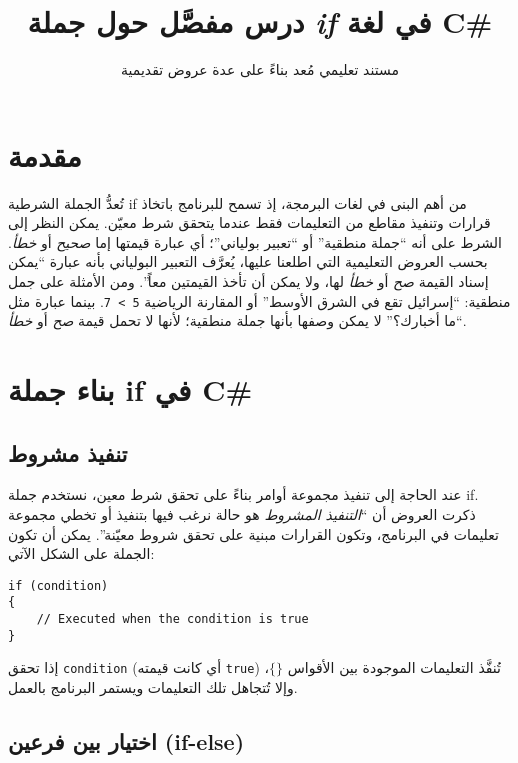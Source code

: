 ﻿\documentclass[12pt]{article}
\begin{document}
\title{درس مفصَّل حول جملة \emph{\textenglish{if}} في لغة C\#}
\author{مستند تعليمي مُعد بناءً على عدة عروض تقديمية}
\date{}

\maketitle
\thispagestyle{fancy}

\section*{مقدمة}

تُعدُّ الجملة الشرطية \textenglish{if} من أهم البنى في لغات البرمجة، إذ تسمح للبرنامج باتخاذ قرارات وتنفيذ مقاطع من التعليمات فقط عندما يتحقق شرط معيّن. يمكن النظر إلى الشرط على أنه ``جملة منطقية'' أو ``تعبير بولياني''؛ أي عبارة قيمتها إما \emph{صحيح} أو \emph{خطأ}. بحسب العروض التعليمية التي اطلعنا عليها، يُعرَّف التعبير البولياني بأنه عبارة ``يمكن إسناد القيمة \emph{صح} أو \emph{خطأ} لها، ولا يمكن أن تأخذ القيمتين معاً''. ومن الأمثلة على جمل منطقية: ``إسرائيل تقع في الشرق الأوسط'' أو المقارنة الرياضية \verb|5 > 7|. بينما عبارة مثل ``ما أخبارك؟'' لا يمكن وصفها بأنها جملة منطقية؛ لأنها لا تحمل قيمة \emph{صح} أو \emph{خطأ}.

\section{بناء جملة \textenglish{if} في C\#}

\subsection{تنفيذ مشروط}

عند الحاجة إلى تنفيذ مجموعة أوامر بناءً على تحقق شرط معين، نستخدم جملة \textenglish{if}. ذكرت العروض أن ``\emph{التنفيذ المشروط} هو حالة نرغب فيها بتنفيذ أو تخطي مجموعة تعليمات في البرنامج، وتكون القرارات مبنية على تحقق شروط معيّنة''. يمكن أن تكون الجملة على الشكل الآتي:

\begin{english}
\begin{verbatim}
if (condition)
{
    // Executed when the condition is true
}
\end{verbatim}
\end{english}

إذا تحقق \verb|condition| (أي كانت قيمته \texttt{true}) تُنفَّذ التعليمات الموجودة بين الأقواس $\{\}$، وإلا تُتجاهل تلك التعليمات ويستمر البرنامج بالعمل.

\subsection{اختيار بين فرعين (\textenglish{if-else})}
\end{document}
